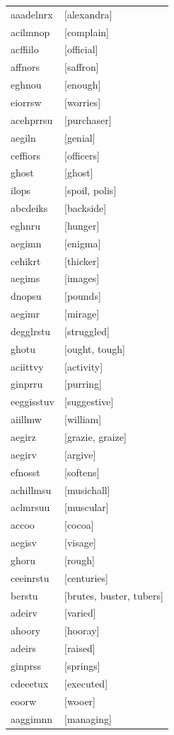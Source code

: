 \documentclass{article}
\begin{document}
\begin{tabular}{ll}
aaadelnrx & [alexandra] \\
acilmnop & [complain] \\
acffiilo & [official] \\
affnors & [saffron] \\
eghnou & [enough] \\
eiorrsw & [worries] \\
acehprrsu & [purchaser] \\
aegiln & [genial] \\
ceffiors & [officers] \\
ghost & [ghost] \\
ilops & [spoil, polis] \\
abcdeiks & [backside] \\
eghnru & [hunger] \\
aegimn & [enigma] \\
cehikrt & [thicker] \\
aegims & [images] \\
dnopsu & [pounds] \\
aegimr & [mirage] \\
degglrstu & [struggled] \\
ghotu & [ought, tough] \\
aciittvy & [activity] \\
ginprru & [purring] \\
eeggisstuv & [suggestive] \\
aiillmw & [william] \\
aegirz & [grazie, graize] \\
aegirv & [argive] \\
efnosst & [softens] \\
achillmsu & [musichall] \\
aclmrsuu & [muscular] \\
accoo & [cocoa] \\
aegisv & [visage] \\
ghoru & [rough] \\
ceeinrstu & [centuries] \\
berstu & [brutes, buster, tubers] \\
adeirv & [varied] \\
ahoory & [hooray] \\
adeirs & [raised] \\
ginprss & [springs] \\
cdeeetux & [executed] \\
eoorw & [wooer] \\
aaggimnn & [managing] \\

\end{tabular}
\end{document}
